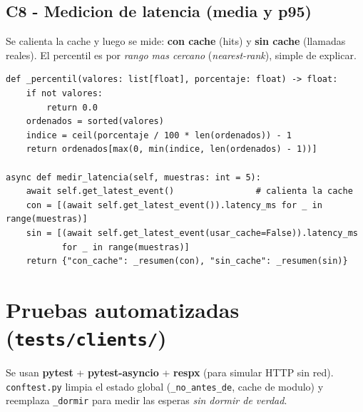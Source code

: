 \documentclass[11pt,a4paper]{article}
\newcommand{\arch}[1]{\texttt{#1}}
\begin{document}
\subsection{C8 - Medicion de latencia (media y p95)}
Se calienta la cache y luego se mide: \textbf{con cache} (hits) y
\textbf{sin cache} (llamadas reales). El percentil es por
\emph{rango mas cercano} (\emph{nearest-rank}), simple de explicar.

\begin{lstlisting}[caption={Percentil y resumen de latencia}]
def _percentil(valores: list[float], porcentaje: float) -> float:
    if not valores:
        return 0.0
    ordenados = sorted(valores)
    indice = ceil(porcentaje / 100 * len(ordenados)) - 1
    return ordenados[max(0, min(indice, len(ordenados) - 1))]

async def medir_latencia(self, muestras: int = 5):
    await self.get_latest_event()                # calienta la cache
    con = [(await self.get_latest_event()).latency_ms for _ in range(muestras)]
    sin = [(await self.get_latest_event(usar_cache=False)).latency_ms
           for _ in range(muestras)]
    return {"con_cache": _resumen(con), "sin_cache": _resumen(sin)}
\end{lstlisting}

\section{Pruebas automatizadas (\arch{tests/clients/})}

Se usan \textbf{pytest} + \textbf{pytest-asyncio} + \textbf{respx} (para
simular HTTP sin red). \arch{conftest.py} limpia el estado global
(\arch{\_no\_antes\_de}, cache de modulo) y reemplaza \arch{\_dormir} para
medir las esperas \emph{sin dormir de verdad}.
\end{document}
